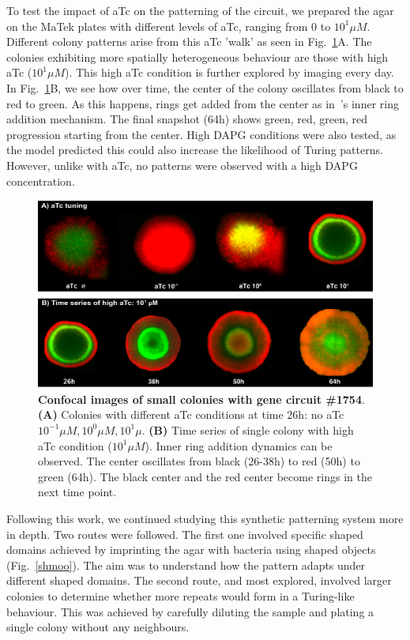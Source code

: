 To test the impact of aTc on the patterning of the circuit, we prepared the agar on the MaTek plates with different levels of aTc, ranging from 0 to $10^1 \mu M$.
Different colony patterns arise from this aTc 'walk' as seen in Fig.~\ref{atcwalk_timeseries_confocal}A.
The colonies exhibiting more spatially heterogeneous behaviour are those with high aTc ($10^1 \mu M$).
This high aTc condition is further explored by imaging every day.
In Fig.~\ref{atcwalk_timeseries_confocal}B, we see how over time, the center of the colony oscillates from black to red to green.
As this happens, rings get added from the center as in~\cite{Konow2019}'s inner ring addition mechanism.
The final snapshot (64h) shows green, red, green, red progression starting from the center.
High DAPG conditions were also tested, as the model predicted this could also increase the likelihood of Turing patterns.
However, unlike with aTc, no patterns were observed with a high DAPG concentration.
\begin{figure}[H]

    \includegraphics[width=1\textwidth]{chapters/Chapter 3/atcwalk_timeseries_confocal}
    \caption{\textbf{Confocal images of small colonies with gene circuit \#1754}. \textbf{(A)} Colonies with different aTc conditions at time 26h: no aTc $10^{-1} \mu M,10^{0} \mu M,10^{1} \mu  $. \textbf{(B)} Time series of single colony with high aTc condition ($10^1 \mu M$). Inner ring addition dynamics can be observed. The center oscillates from black (26-38h) to red (50h) to green (64h). The black center and the red center become rings in the next time point. }
    \label{atcwalk_timeseries_confocal}
\end{figure}

Following this work, we continued studying this synthetic patterning system more in depth.
Two routes were followed.
The first one involved specific shaped domains achieved by imprinting the agar with bacteria using shaped objects (Fig.~\ref{shmoo}).
The aim was to understand how the pattern adapts under different shaped domains.
The second route, and most explored, involved larger colonies to determine whether more repeats would form in a Turing-like behaviour.
This was achieved by carefully diluting the sample and plating a single colony without any neighbours.

